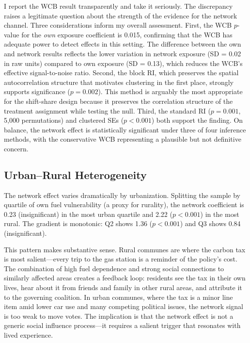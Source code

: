 \documentclass[12pt]{article}
\begin{document}
I report the WCB result transparently and take it seriously. The discrepancy raises a legitimate question about the strength of the evidence for the network channel. Three considerations inform my overall assessment. First, the WCB $p$-value for the \emph{own} exposure coefficient is 0.015, confirming that the WCB has adequate power to detect effects in this setting. The difference between the own and network results reflects the lower variation in network exposure (SD = 0.02 in raw units) compared to own exposure (SD = 0.13), which reduces the WCB's effective signal-to-noise ratio. Second, the block RI, which preserves the spatial autocorrelation structure that motivates clustering in the first place, strongly supports significance ($p = 0.002$). This method is arguably the most appropriate for the shift-share design because it preserves the correlation structure of the treatment assignment while testing the null. Third, the standard RI ($p = 0.001$, 5,000 permutations) and clustered SEs ($p < 0.001$) both support the finding. On balance, the network effect is statistically significant under three of four inference methods, with the conservative WCB representing a plausible but not definitive concern.

\subsection{Urban--Rural Heterogeneity}

The network effect varies dramatically by urbanization. Splitting the sample by quartile of own fuel vulnerability (a proxy for rurality), the network coefficient is 0.23 (insignificant) in the most urban quartile and 2.22 ($p < 0.001$) in the most rural. The gradient is monotonic: Q2 shows 1.36 ($p < 0.001$) and Q3 shows 0.84 (insignificant).

This pattern makes substantive sense. Rural communes are where the carbon tax is most salient---every trip to the gas station is a reminder of the policy's cost. The combination of high fuel dependence and strong social connections to similarly affected areas creates a feedback loop: residents see the tax in their own lives, hear about it from friends and family in other rural areas, and attribute it to the governing coalition. In urban communes, where the tax is a minor line item amid lower car use and many competing political issues, the network signal is too weak to move votes. The implication is that the network effect is not a generic social influence process---it requires a salient trigger that resonates with lived experience.
\end{document}
